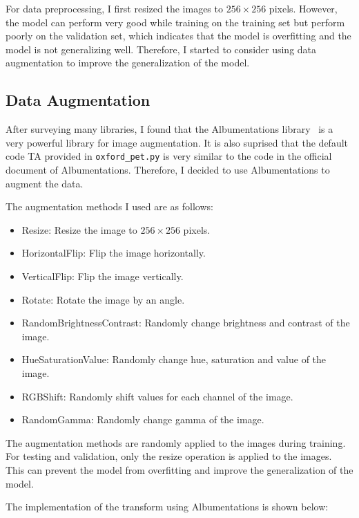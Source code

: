 
For data preprocessing, I first resized the images to $256 \times 256$ pixels.
However, the model can perform very good while training on the training set but perform poorly on the validation set, which indicates that the model is overfitting and the model is not generalizing well.
Therefore, I started to consider using data augmentation to improve the generalization of the model.

\subsection{Data Augmentation}

After surveying many libraries, I found that the Albumentations library~\cite{Albumentations} is a very powerful library for image augmentation.
It is also suprised that the default code TA provided in \texttt{oxford\_pet.py} is very similar to the code in the official document of Albumentations.
Therefore, I decided to use Albumentations to augment the data.

The augmentation methods I used are as follows:

\begin{itemize}
    \item Resize: Resize the image to $256 \times 256$ pixels.
    \item HorizontalFlip: Flip the image horizontally.
    \item VerticalFlip: Flip the image vertically.
    \item Rotate: Rotate the image by an angle.
    \item RandomBrightnessContrast: Randomly change brightness and contrast of the image.
    \item HueSaturationValue: Randomly change hue, saturation and value of the image.
    \item RGBShift: Randomly shift values for each channel of the image.
    \item RandomGamma: Randomly change gamma of the image.
\end{itemize}

The augmentation methods are randomly applied to the images during training.
For testing and validation, only the resize operation is applied to the images.
This can prevent the model from overfitting and improve the generalization of the model.

The implementation of the transform using Albumentations is shown below:

\inputminted[firstline=158]{python}{../src/oxford_pet.py}
